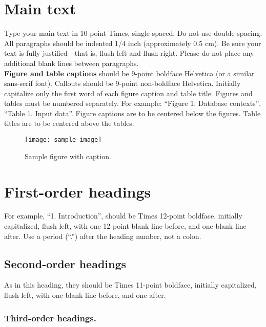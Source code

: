 \documentclass[10pt]{article}
\begin{document}
\section{Main text}

Type your main text in 10-point Times, single-spaced. Do not use double-spacing. All paragraphs should be indented 1/4 inch (approximately 0.5 cm).  Be sure your text is fully justified—that is, flush left and flush right. Please do not place any additional blank lines between paragraphs. \\
\textbf{Figure and table captions} should be 9-point boldface Helvetica (or a similar sans-serif font).  Callouts should be 9-point non-boldface Helvetica. Initially capitalize only the first word of each figure caption and table title. Figures and tables must be numbered separately. For example: ``Figure 1. Database contexts'', ``Table 1. Input data''. Figure captions are to be centered below the figures. Table titles are to be centered above the tables.

\begin{figure}[thb]
    \centering
    \texttt{[image: sample-image]}
    \caption{Sample figure with caption.}
    \label{fig: sample-figure}       %
\end{figure}

\section{First-order headings}

For example, “1. Introduction”, should be Times 12-point boldface, initially capitalized, flush left, with one 12-point blank line before, and one blank line after. Use a period (“.”) after the heading number, not a colon.

\subsection{Second-order headings}

As in this heading, they should be Times 11-point boldface, initially capitalized, flush left, with one blank line before, and one after.

\subsubsection{Third-order headings. }
\end{document}
